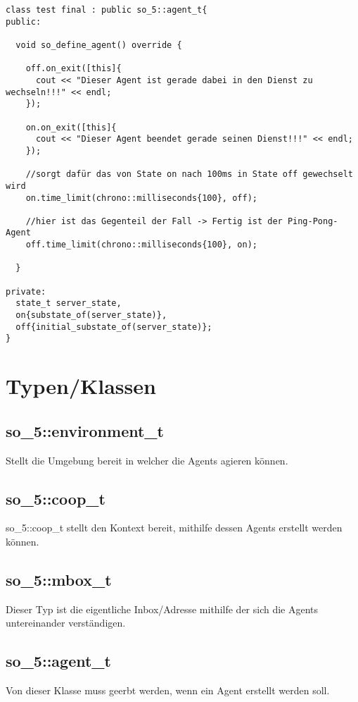 \begin{verbatim}
class test final : public so_5::agent_t{
public:

  void so_define_agent() override {
  
    off.on_exit([this]{
      cout << "Dieser Agent ist gerade dabei in den Dienst zu wechseln!!!" << endl;
    });
    
    on.on_exit([this]{
      cout << "Dieser Agent beendet gerade seinen Dienst!!!" << endl;
    });
    
    //sorgt dafür das von State on nach 100ms in State off gewechselt wird
    on.time_limit(chrono::milliseconds{100}, off);
    
    //hier ist das Gegenteil der Fall -> Fertig ist der Ping-Pong-Agent
    off.time_limit(chrono::milliseconds{100}, on);
  
  }

private:
  state_t server_state,
  on{substate_of(server_state)},
  off{initial_substate_of(server_state)};
}
\end{verbatim}

\section{Typen/Klassen}

\subsection{so\_5::environment\_t}
Stellt die Umgebung bereit in welcher die Agents agieren können.

\subsection{so\_5::coop\_t}
so\_5::coop\_t stellt den Kontext bereit, mithilfe dessen Agents erstellt werden können.

\subsection{so\_5::mbox\_t}
Dieser Typ ist die eigentliche Inbox/Adresse mithilfe der sich die Agents untereinander verständigen.

\subsection{so\_5::agent\_t}
Von dieser Klasse muss geerbt werden, wenn ein Agent erstellt werden soll.

